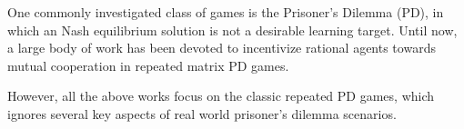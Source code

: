 \documentclass{article}
\begin{document}
One commonly investigated class of games is the Prisoner's Dilemma (PD), in which an Nash equilibrium solution is not a desirable learning target. Until now, a large body of work \cite{axelrod1984evolution,nowak1993strategy,banerjee2007reaching,crandall2005learning,damer2008achieving,hao2015introducing,mathieu2015new} has been devoted to incentivize rational agents towards mutual cooperation in repeated matrix PD games.
\begin{comment}
One of the earliest strategies in this direction is Tit-for-Tat \cite{axelrod1984evolution} or variants such as win-stay lose-shift \cite{nowak1993strategy}. Later, various multiagent learning strategies have been proposed in the last decade. For example, Banerjee and Sen \shortcite{banerjee2007reaching} propose a conditional joint action leaner to allow agents to discover non-NE outcomes that are beneficial for both players and provide agents with incentives to make these outcomes stable. There also exist works \cite{crandall2005learning,hao2015introducing} that integrate a ``teacher and follower'' mechanism into strategy design to: 1) teach opponents to behave cooperatively and punish them otherwise and 2) use a follower strategy to avoid being exploited by the opponent in case the teaching has no influence on the opponent's behavior. For scenarios when the game changes frequently, Damer and Gini \shortcite{damer2008achieving} investigate how to achieve cooperation by estimating the opponent's cooperative attitude using a particle filter and reciprocate accordingly.
\end{comment}
However, all the above works focus on the classic repeated PD games, which ignores several key aspects of real world prisoner's dilemma scenarios.
\begin{comment}
In repeated matrix PD games, the moves are atomic actions and can be easily labeled as cooperative or uncooperative or learned from the payoffs \cite{busoniu2008comprehensive}. In contrast, in real world PD games cooperation/defection behaviors are temporally extended and the payoff signals are usually delayed (available after a number of steps of interactions).
Crandall \cite{crandall2012just} proposes the Pepper framework for repeated stochastic PD games (e.g., two-player gate entering problem) which allows extending strategies originally proposed for repeated matrix games. Later Elidrisi et al. \cite{elidrisi2014fast} extend Pepper by introducing the meta game abstraction model to reduce a stochastic game representation to a matrix game. Their approach is shown to accelerate the multiagent learning speed in stochastic games with a large state space. Hernandez-Leal and Kaisers \cite{Hernandez2017Towards} combine two established frameworks Pepper and Bayesian policy reuse to enable the agent to quickly select the appropriate policy against its switching opponents. However, the above approaches rely  on hand-crafted state inputs and tabular Q-learning techniques to learn optimal control policies. They cannot be directly applied to more realistic environments whose states are too large and complex to be analyzed beforehand.
\end{comment}
\end{document}
